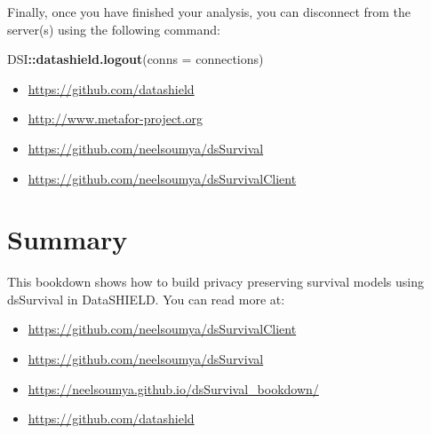 \documentclass[
]{book}
\newenvironment{Shaded}{\begin{snugshade}}{\end{snugshade}}
\newcommand{\DataTypeTok}[1]{\textcolor[rgb]{0.13,0.29,0.53}{#1}}
\newcommand{\KeywordTok}[1]{\textcolor[rgb]{0.13,0.29,0.53}{\textbf{#1}}}
\newcommand{\NormalTok}[1]{#1}
\newcommand{\OperatorTok}[1]{\textcolor[rgb]{0.81,0.36,0.00}{\textbf{#1}}}
\begin{document}
Finally, once you have finished your analysis, you can disconnect from the server(s) using the following command:

\begin{Shaded}
\begin{Highlighting}[]
\NormalTok{DSI}\OperatorTok{::}\KeywordTok{datashield.logout}\NormalTok{(}\DataTypeTok{conns =}\NormalTok{ connections)}
\end{Highlighting}
\end{Shaded}

\newpage

\begin{itemize}
\item
  \url{https://github.com/datashield}
\item
  \url{http://www.metafor-project.org}
\item
  \url{https://github.com/neelsoumya/dsSurvival}
\item
  \url{https://github.com/neelsoumya/dsSurvivalClient}
\end{itemize}

\hypertarget{summary}{%
\chapter{Summary}\label{summary}}

This bookdown shows how to build privacy preserving survival models using dsSurvival in DataSHIELD. You can read more at:

\begin{itemize}
\item
  \url{https://github.com/neelsoumya/dsSurvivalClient}
\item
  \url{https://github.com/neelsoumya/dsSurvival}
\item
  \url{https://neelsoumya.github.io/dsSurvival_bookdown/}
\item
  \url{https://github.com/datashield}
\end{itemize}

  
\end{document}
